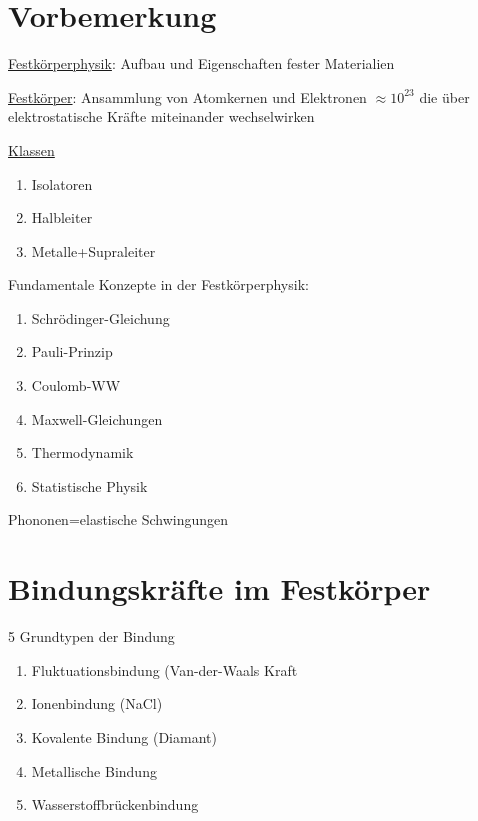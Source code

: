 



\setcounter{chapter}{0}
\chapter*{Vorbemerkung}

\underline{Festkörperphysik}: Aufbau und Eigenschaften fester Materialien

\underline{Festkörper}: Ansammlung von Atomkernen und Elektronen \(\approx
10^{23}\) die über elektrostatische Kräfte miteinander wechselwirken

\underline{Klassen}
\begin{enumerate}
\item Isolatoren
\item Halbleiter
\item Metalle+Supraleiter
\end{enumerate}

Fundamentale Konzepte in der Festkörperphysik:

\begin{enumerate}
\item Schrödinger-Gleichung
\item Pauli-Prinzip
\item Coulomb-WW
\item Maxwell-Gleichungen
\item Thermodynamik
\item Statistische Physik
\end{enumerate}

 Phononen=elastische Schwingungen

\chapter{Bindungskräfte im Festkörper}
5 Grundtypen der Bindung
\begin{enumerate}
\item Fluktuationsbindung (Van-der-Waals Kraft
\item Ionenbindung (NaCl)
\item Kovalente Bindung (Diamant)
\item Metallische Bindung
\item Wasserstoffbrückenbindung
\end{enumerate}

